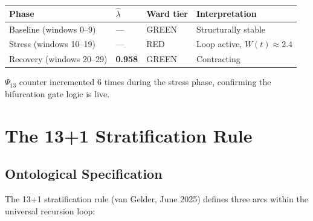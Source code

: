 \documentclass[12pt,a4paper]{article}
\theoremstyle{plain}
\theoremstyle{definition}
\renewcommand{\Psi}{\varPsi}
\begin{document}
\begin{tcolorbox}[colback=boxbg, colframe=boxborder, title={\bfseries Key Numerical Results (Smoke Test)}]
  \begin{center}
  \begin{tabular}{llll}
    \toprule
    Phase & $\hat\lambda$ & Ward tier & Interpretation \\
    \midrule
    Baseline (windows 0--9) & --- & \textcolor{wardgreen}{GREEN} & Structurally stable \\
    Stress (windows 10--19) & --- & \textcolor{wardred}{RED} & Loop active, $W(t)\approx 2.4$ \\
    Recovery (windows 20--29) & \textbf{0.958} & \textcolor{wardgreen}{GREEN} & Contracting \\
    \bottomrule
  \end{tabular}
  \end{center}
  $\Psi_{13}$ counter incremented 6 times during the stress phase, confirming the
  bifurcation gate logic is live.
\end{tcolorbox}

\section{The 13+1 Stratification Rule}
\label{sec:strata}

\subsection{Ontological Specification}
\label{sec:strata:spec}

The 13+1 stratification rule (van Gelder, June 2025) defines three arcs within the
universal recursion loop:
\end{document}
